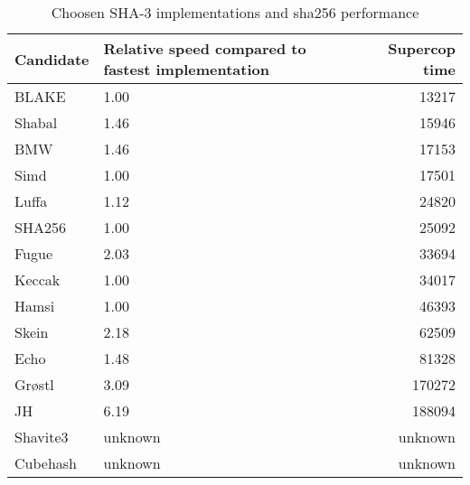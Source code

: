 \begin{table}
  \centering
  \begin{tabular}{ | l | p{6cm} | r | }
    \hline
    \textbf{Candidate} & \textbf{Relative speed compared to fastest implementation} &
    \textbf{Supercop time} \\ \hline

     BLAKE      & 1.00              & 13217         \\ \hline
     Shabal     & 1.46              & 15946         \\ \hline
     \ac{BMW}   & 1.46              & 17153         \\ \hline
     Simd       & 1.00              & 17501         \\ \hline
     Luffa      & 1.12              & 24820         \\ \hline
     SHA256     & 1.00              & 25092         \\ \hline
     Fugue      & 2.03              & 33694         \\ \hline
     Keccak     & 1.00              & 34017         \\ \hline
     Hamsi      & 1.00              & 46393         \\ \hline
     Skein      & 2.18              & 62509         \\ \hline
     Echo       & 1.48              & 81328         \\ \hline
     Grøstl    & 3.09              & 170272        \\ \hline
     JH         & 6.19              & 188094        \\ \hline
     Shavite3   & unknown           & unknown       \\ \hline
     Cubehash   & unknown           & unknown       \\ \hline
  \end{tabular}
  \caption{Choosen \ac{SHA}-3 implementations and sha256 performance}
  \label{tbl:sha3:speedrelative}
\end{table}
